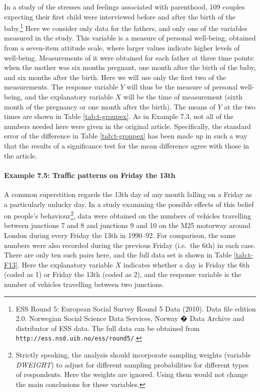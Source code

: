 \documentclass[11pt,a4paper,openany]{book}
\let\oldparagraph\paragraph
\renewcommand{\paragraph}[1]{\oldparagraph{#1}\mbox{}}
\let\rmarkdownfootnote\footnote%
\def\footnote{\protect\rmarkdownfootnote}
\begin{document}
In a study of the stresses and feelings associated with parenthood, 109
couples expecting their first child were interviewed before and after
the birth of the baby.\footnote{ESS Round 5: European Social Survey
  Round 5 Data (2010). Data file edition 2.0. Norwegian Social Science
  Data Services, Norway � Data Archive and distributor of ESS data. The
  full data can be obtained from
  \texttt{http://ess.nsd.uib.no/ess/round5/}.} Here we consider only
data for the fathers, and only one of the variables measured in the
study. This variable is a measure of personal well-being, obtained from
a seven-item attitude scale, where larger values indicate higher levels
of well-being. Measurements of it were obtained for each father at three
time points: when the mother was six months pregnant, one month after
the birth of the baby, and six months after the birth. Here we will use
only the first two of the measurements. The response variable \(Y\) will
thus be the measure of personal well-being, and the explanatory variable
\(X\) will be the time of measurement (sixth month of the pregnancy or
one month after the birth). The means of \(Y\) at the two times are
shown in Table \ref{tab:t-groupex}. As in Example 7.3, not all of the
numbers needed here were given in the original article. Specifically,
the standard error of the difference in Table \ref{tab:t-groupex} has
been made up in such a way that the results of a significance test for
the mean difference agree with those in the article.

\hypertarget{p-ex75}{\paragraph{Example 7.5: Traffic patterns on Friday
the 13th}\label{p-ex75}}

A common superstition regards the 13th day of any month falling on a
Friday as a particularly unlucky day. In a study examining the possible
effects of this belief on people's behaviour\footnote{Strictly speaking,
  the analysis should incorporate sampling weights (variable
  \emph{DWEIGHT}) to adjust for different sampling probabilities for
  different types of respondents. Here the weights are ignored. Using
  them would not change the main conclusions for these variables.}, data
were obtained on the numbers of vehicles travelling between junctions 7
and 8 and junctions 9 and 10 on the M25 motorway around London during
every Friday the 13th in 1990--92. For comparison, the same numbers were
also recorded during the previous Friday (i.e.~the 6th) in each case.
There are only ten such pairs here, and the full data set is shown in
Table \ref{tab:t-F13}. Here the explanatory variable \(X\) indicates
whether a day is Friday the 6th (coded as 1) or Friday the 13th (coded
as 2), and the response variable is the number of vehicles travelling
between two junctions.
\end{document}
